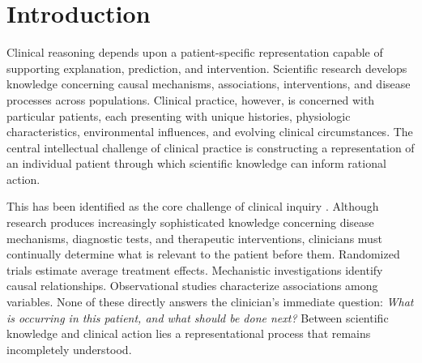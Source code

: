 \documentclass[11pt]{article}
\begin{document}
\begin{abstract}
Clinical reasoning requires a patient-specific representation that supports explanation, prediction, intervention, and continued inquiry. Scientific knowledge, however, is expressed at the level of classes rather than patients. This paper identifies the transformation from generalized causal knowledge and patient-specific evidence into an individualized explanatory representation as clinical instantiation. The instantiated causal model represents the clinician’s provisional, fallible understanding of which mechanisms may be operative in a patient at a particular time. This framework clarifies how population knowledge becomes patient-specific reasoning, complements existing approaches to clinical inference, and provides a conceptual basis for personalized medicine, education, causal modeling, and intelligent clinical systems.

\vspace{0.5em}
\noindent\textit{Keywords:} causal models; knowledge representation; personalized medicine; mechanistic reasoning; evidence-based practice
\end{abstract}


\newpage

\section{Introduction}

Clinical reasoning depends upon a patient-specific representation capable of supporting explanation, prediction, and intervention. Scientific research develops knowledge concerning causal mechanisms, associations, interventions, and disease processes across populations. Clinical practice, however, is concerned with particular patients, each presenting with unique histories, physiologic characteristics, environmental influences, and evolving clinical circumstances. The central intellectual challenge of clinical practice is constructing a representation of an individual patient through which scientific knowledge can inform rational action.

This has been identified as the core challenge of clinical inquiry
\parencite{collins_dynamic_2014, collins_synthesis_2018, anjum2020rethinking}.
Although research produces increasingly sophisticated knowledge concerning disease mechanisms, diagnostic tests, and therapeutic interventions, clinicians must continually determine what is relevant to the patient before them. Randomized trials estimate average treatment effects. Mechanistic investigations identify causal relationships. Observational studies characterize associations among variables. None of these directly answers the clinician's immediate question:
\emph{What is occurring in this patient, and what should be done next?}
Between scientific knowledge and clinical action lies a representational process that remains incompletely understood.
\end{document}
